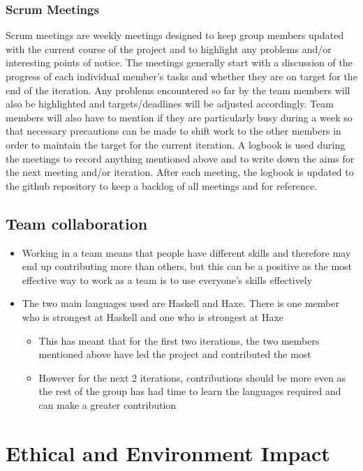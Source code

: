 \documentclass[12pt]{article}
\begin{document}
\subsubsection{Scrum Meetings}
Scrum meetings are weekly meetings designed to keep group members updated with 
the current course of the project and to highlight any problems and/or 
interesting points of notice. The meetings generally start with a discussion of 
the progress of each individual member's tasks and whether they are on target for 
the end of the iteration. Any problems encountered so far by the team members 
will also be highlighted and targets/deadlines will be adjusted accordingly. 
Team members will also have to mention if they are particularly busy during a 
week so that necessary precautions can be made to shift work to the other 
members in order to maintain the target for the current iteration. 
A logbook is used during the meetings to record anything mentioned 
above and to write down the aims for the next meeting and/or iteration. 
After each meeting, the logbook is updated to the github repository to keep a 
backlog of all meetings and for reference.

\subsection{Team collaboration}

\begin{itemize}
\item Working in a team means that people have different skills and therefore
may end up contributing more than others, but this can be a positive
as the most effective way to work as a team is to use everyone's skills
effectively
\item The two main languages used are Haskell and Haxe. There is one member
who is strongest at Haskell and one who is strongest at Haxe

\begin{itemize}
\item This has meant that for the first two iterations, the two members
mentioned above have led the project and contributed the most
\item However for the next 2 iterations, contributions should be more even
as the rest of the group has had time to learn the languages required
and can make a greater contribution
\end{itemize}
\end{itemize}

\section{Ethical and Environment Impact}
\end{document}
